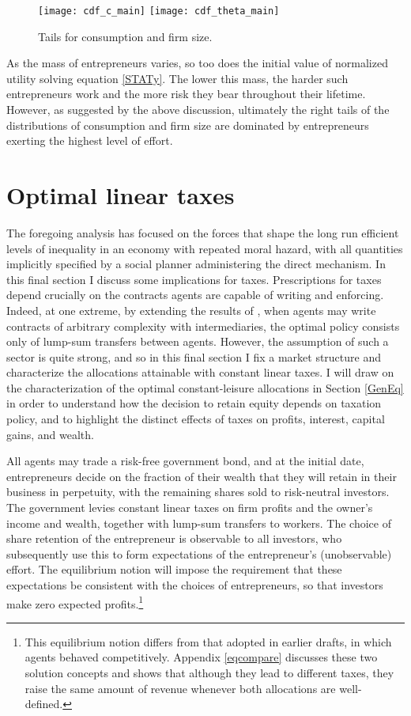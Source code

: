 \documentclass[11pt]{article}
\theoremstyle{plain}
\begin{document}
\begin{figure}[!htb]
\centering
\texttt{[image: cdf\_c\_main]}
\texttt{[image: cdf\_theta\_main]}
\caption{Tails for consumption and firm size.}\label{fig:tails_dist}
\end{figure}

As the mass of entrepreneurs varies, so too does the initial value of normalized utility solving equation \eqref{STATy}. The lower this mass, the harder such entrepreneurs work and the more risk they bear throughout their lifetime. However, as suggested by the above discussion, ultimately the right tails of the distributions of consumption and firm size are dominated by entrepreneurs exerting the highest level of effort. 

\section{Optimal linear taxes} \label{Imp}

The foregoing analysis has focused on the forces that shape the long run efficient levels of inequality in an economy with repeated moral hazard, with all quantities implicitly specified by a social planner administering the direct mechanism. In this final section I discuss some implications for taxes. Prescriptions for taxes depend crucially on the contracts agents are capable of writing and enforcing. Indeed, at one extreme, by extending the results of \cite{atkeson_efficient_1992}, when agents may write contracts of arbitrary complexity with intermediaries, the optimal policy consists only of lump-sum transfers between agents. However, the assumption of such a sector is quite strong, and so in this final section I fix a market structure and characterize the allocations attainable with constant linear taxes. I will draw on the characterization of the optimal constant-leisure allocations in Section \ref{GenEq} in order to understand how the decision to retain equity depends on taxation policy, and to highlight the distinct effects of taxes on profits, interest, capital gains, and wealth. 


All agents may trade a risk-free government bond, and at the initial date, entrepreneurs decide on the fraction of their wealth that they will retain in their business in perpetuity, with the remaining shares sold to risk-neutral investors. The government levies constant linear taxes on firm profits and the owner's income and wealth, together with lump-sum transfers to workers. The choice of share retention of the entrepreneur is observable to all investors, who subsequently use this to form expectations of the entrepreneur's (unobservable) effort. The equilibrium notion will impose the requirement that these expectations be consistent with the choices of entrepreneurs, so that investors make zero expected profits.\footnote{This equilibrium notion differs from that adopted in earlier drafts, in which agents behaved competitively. Appendix \ref{eqcompare} discusses these two solution concepts and shows that although they lead to different taxes, they raise the same amount of revenue whenever both allocations are well-defined.}
\end{document}

